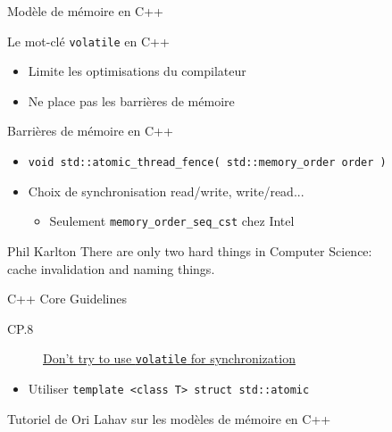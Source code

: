 
\begingroup

\begin{frame}[fragile]{Modèle de mémoire en C++}
  \vfill
  \begin{block}{Le mot-clé \lstinline{volatile} en C++}
    \begin{itemize}
    \item Limite les optimisations du compilateur
    \item \alert{Ne place pas les barrières de mémoire}
    \end{itemize}
  \end{block}
  \vfill
  \begin{block}{Barrières de mémoire en C++}
    \begin{itemize}
    \item \lstinline{void std::atomic_thread_fence( std::memory_order order )}
    \item Choix de synchronisation read/write, write/read...
      \begin{itemize}
      \item Seulement \lstinline{memory_order_seq_cst} chez Intel
      \end{itemize}
    \end{itemize}
    \begin{shadequote}{Phil Karlton}
      There are only two hard things in Computer Science: \\cache invalidation and naming things.
    \end{shadequote}
  \end{block}

  \vspace{-3mm}
  \begin{alertblock}{C++ Core Guidelines}
    \begin{description}
    \item[CP.8] \href{https://isocpp.github.io/CppCoreGuidelines/CppCoreGuidelines#Rconc-volatile}{Don’t try to use \lstinline{volatile} for synchronization}
    \end{description}
    \begin{itemize}
    \item Utiliser \lstinline{template <class T> struct std::atomic}
    \end{itemize}
  \end{alertblock}
  \vspace{-1mm}
  \begin{citing}
  \item Tutoriel de Ori Lahav sur les modèles de mémoire en C++
  \end{citing}
\end{frame}

\endgroup
\endinput
